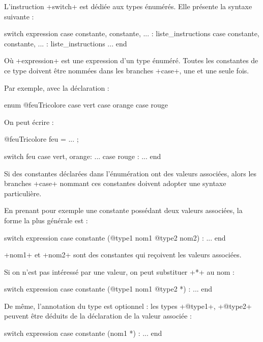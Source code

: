 
L'instruction \ggs+switch+ est dédiée aux types énumérés. Elle présente la syntaxe suivante :

\begin{galgas}
switch expression
case constante, constante, ... :
  liste_instructions
case constante, constante, ... :
  liste_instructions
...
end
\end{galgas}


Où \ggs+expression+ est une expression d'un type énuméré. Toutes les constantes de ce type doivent être nommées dans les branches \ggs+case+, une et une seule fois.

Par exemple, avec la déclaration :

\begin{galgas}
enum @feuTricolore {
  case vert
  case orange
  case rouge
}
\end{galgas}

On peut écrire :

\begin{galgas}
@feuTricolore feu = ... ;

switch feu
case vert, orange:
  ...
case rouge :
  ...
end
\end{galgas}

Si des constantes déclarées dans l'énumération ont des valeurs associées, alors les branches \ggs+case+ nommant ces constantes doivent adopter une syntaxe particulière. 

En prenant pour exemple une constante possédant deux valeurs associées, la forme la plus générale est :

\begin{galgas}
switch expression
case constante (@type1 nom1 @type2 nom2) :
...
end
\end{galgas}

\ggs+nom1+ et \ggs+nom2+ sont des constantes qui reçoivent les valeurs associées.

Si on n'est pas intéressé par une valeur, on peut substituer \ggs+*+ au nom :

\begin{galgas}
switch expression
case constante (@type1 nom1 @type2 *) :
...
end
\end{galgas}

De même, l'annotation du type est optionnel : les types \ggs+@type1+, \ggs+@type2+ peuvent être déduits de la déclaration de la valeur associée :

\begin{galgas}
switch expression
case constante (nom1 *) :
...
end
\end{galgas}

